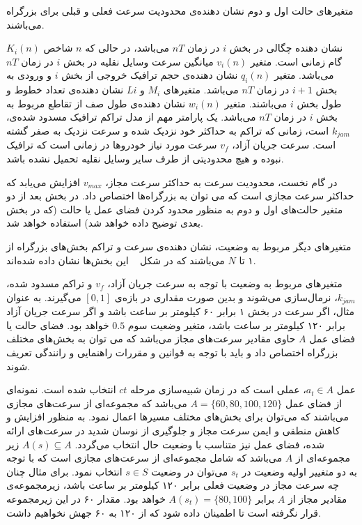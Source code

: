 متغیرهای حالت اول و دوم نشان دهنده‌ی محدودیت سرعت فعلی و قبلی برای بزرگراه می‌باشند.

$K_{i}(n)$ نشان دهنده چگالی در بخش $i$ در زمان $nT$ می‌باشد، در حالی که $n$ شاخص گام زمانی است.
متغیر $v_{i}(n)$ میانگین سرعت وسایل نقلیه در بخش $i$ در زمان $nT$ می‌باشد.
متغیر $q_{i}(n)$ نشان دهنده‌ی حجم ترافیک خروجی از بخش $i$ و ورودی به بخش $i+1$ در زمان $nT$ می‌باشد.
متغیرهای $M_{i}$ و $L{i}$ نشان دهنده‌ی تعداد خطوط و طول بخش $i$ می‌باشند.
متغیر $w_{i}(n)$ نشان دهنده‌ی طول صف از تقاطع مربوط به بخش $i$ در زمان $nT$ می‌باشد.
یک پارامتر مهم از مدل تراکم ترافیک مسدود شده‌ی، $k_{jam}$ است، زمانی که تراکم به حداکثر خود نزدیک شده و سرعت نزدیک به صفر گشته است.
سرعت جریان آزاد، $v_{f}$ سرعت مورد نیاز خودروها در زمانی است که ترافیک نبوده و هیچ محدودیتی از طرف سایر وسایل نقلیه تحمیل نشده باشد.

در گام نخست، محدودیت سرعت به حداکثر سرعت مجاز، $v_{max}$ افزایش می‌یابد که حداکثر سرعت مجازی است که می توان به بزرگراه‌ها اختصاص داد.
در بخش بعد از دو متغیر حالت‌های اول و دوم به منظور محدود کردن فضای عمل یا حالت (که در بخش بعدی توضیح داده خواهد شد) استفاده خواهد شد.

متغیرهای دیگر مربوط به وضعیت، نشان دهنده‌ی سرعت و تراکم بخش‌های بزرگراه از ۱ تا $N$ می‌باشند که در شکل ~ این بخش‌ها نشان داده شده‌اند.

متغیرهای مربوط به وضعیت با توجه به سرعت جریان آزاد، $v_{f}$ و تراکم مسدود شده، $k_{jam}$، نرمال‌سازی می‌شوند و بدین صورت مقداری در بازه‌ی $[0, 1]$ می‌گیرند.
به عنوان مثال، اگر سرعت در بخش ۱ برابر ۶۰ کیلومتر بر ساعت باشد و اگر سرعت جریان آزاد برابر ۱۲۰ کیلومتر بر ساعت باشد، متغیر وضعیت سوم $0.5$ خواهد بود.
فضای حالت یا فضای عمل $A$ حاوی مقادیر سرعت‌های مجاز می‌باشد که می توان به بخش‌های مختلف بزرگراه اختصاص داد و باید با توجه به قوانین و مقررات راهنمایی و رانندگی تعریف شوند.

عمل $a_{t} \in A$، عملی است که در زمان شبیه‌سازی مرحله $ct$ انتخاب شده است.
نمونه‌ای از فضای عمل $A=\{60,80,100,120\}$ می‌باشد که مجموعه‌ای از سرعت‌های مجازی می‌باشند که می‌توان برای بخش‌های مختلف مسیرها اعمال نمود.
به منظور افزایش و کاهش منطقی و ایمن سرعت مجاز و جلوگیری از نوسان شدید در سرعت‌های ارائه شده، فضای عمل نیز متناسب با وضعیت حال انتخاب می‌گردد.
$A(s) \subseteq A$ زیر مجموعه‌ای از $A$ می‌باشد که شامل مجموعه‌ای از سرعت‌های مجازی است که با توجه به دو متغییر اولیه وضعیت در $s_{t}$ می‌توان در وضعیت $s \in S$ انتخاب نمود.
برای مثال چنان چه سرعت مجاز در وضعیت فعلی برابر ۱۲۰ کیلومتر بر ساعت باشد، زیرمجموعه‌ی مقادیر مجاز از $A$ برابر $A(s_{t})=\{80,100\}$ خواهد بود. مقدار ۶۰ در این زیرمجموعه قرار نگرفته است تا اطمینان داده شود که از ۱۲۰ به ۶۰ جهش نخواهیم داشت.

